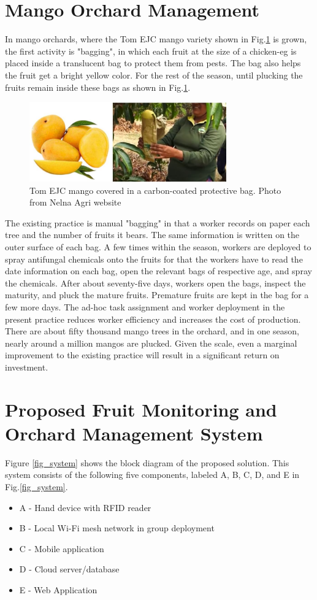\documentclass[journal]{IEEEtran}
\begin{document}
\section{Mango Orchard Management}
In mango orchards, where the Tom EJC mango variety shown in Fig.\ref{fig_TomEJC} is grown, the first activity is "bagging", in which each fruit at the size of a chicken-eg is placed inside a translucent bag to protect them from pests. The bag also helps the fruit get a bright yellow color. For the rest of the season, until plucking the fruits remain inside these bags as shown in Fig.\ref{fig_TomEJC}.
\begin{figure}[h]
	\centering
	\includegraphics[width = 8.5cm]{graphics/TomEJC.png}
	\caption{Tom EJC mango covered in a carbon-coated protective bag. Photo from Nelna Agri website}
	\label{fig_TomEJC}
\end{figure}
The existing practice is manual "bagging" in that a worker records on paper each tree and the number of fruits it bears. The same information is written on the outer surface of each bag. A few times within the season, workers are deployed to spray antifungal chemicals onto the fruits for that the workers have to read the date information on each bag, open the relevant bags of respective age, and spray the chemicals. After about seventy-five days, workers open the bags, inspect the maturity, and pluck the mature fruits. Premature fruits are kept in the bag for a few more days. The ad-hoc task assignment and worker deployment in the present practice reduces worker efficiency and increases the cost of production. There are about fifty thousand mango trees in the orchard, and in one season, nearly around a million mangos are plucked. Given the scale, even a marginal improvement to the existing practice will result in a significant return on investment.
\section{Proposed Fruit Monitoring and Orchard Management System}
Figure \ref{fig_system} shows the block diagram of the proposed solution. This system consists of the following five components, labeled A, B, C, D, and E in Fig.\ref{fig_system}.
\begin{itemize}
	\item[] A - Hand device with RFID reader
	\item[] B - Local Wi-Fi mesh network in group deployment
	\item[] C - Mobile application
	\item[] D - Cloud server/database
	\item[] E - Web Application
\end{itemize}
\end{document}
